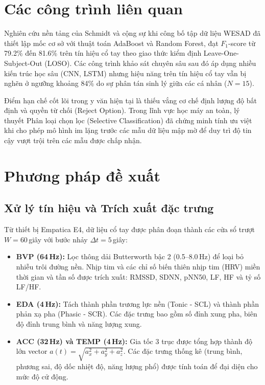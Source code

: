 \documentclass[conference]{IEEEtran}
\begin{document}
\section{Các công trình liên quan}
Nghiên cứu nền tảng của Schmidt và cộng sự \cite{schmidt2018wesad} khi công bố tập dữ liệu WESAD đã thiết lập mốc cơ sở với thuật toán AdaBoost và Random Forest, đạt $F_1$-score từ 79.2\% đến 81.6\% trên tín hiệu cổ tay theo giao thức kiểm định Leave-One-Subject-Out (LOSO). Các công trình khảo sát chuyên sâu sau đó \cite{bobade2020stress} áp dụng nhiều kiến trúc học sâu (CNN, LSTM) nhưng hiệu năng trên tín hiệu cổ tay vẫn bị nghẽn ở ngưỡng khoảng 84\% do sự phân tán sinh lý giữa các cá nhân ($N=15$).

Điểm hạn chế cốt lõi trong y văn hiện tại là thiếu vắng cơ chế định lượng độ bất định và quyền từ chối (Reject Option). Trong lĩnh vực học máy an toàn, lý thuyết Phân loại chọn lọc (Selective Classification) \cite{geifman2017selective} đã chứng minh tính ưu việt khi cho phép mô hình im lặng trước các mẫu dữ liệu mập mờ để duy trì độ tin cậy vượt trội trên các mẫu được chấp nhận.

\section{Phương pháp đề xuất}

\subsection{Xử lý tín hiệu và Trích xuất đặc trưng}
Từ thiết bị Empatica E4, dữ liệu cổ tay được phân đoạn thành các cửa sổ trượt $W = 60$\,giây với bước nhảy $\Delta t = 5$\,giây:
\begin{itemize}
    \item \textbf{BVP (64\,Hz):} Lọc thông dải Butterworth bậc 2 (0.5--8.0\,Hz) để loại bỏ nhiễu trôi đường nền. Nhịp tim và các chỉ số biến thiên nhịp tim (HRV) miền thời gian và tần số được trích xuất: RMSSD, SDNN, pNN50, LF, HF và tỷ số LF/HF.
    \item \textbf{EDA (4\,Hz):} Tách thành phần trương lực nền (Tonic - SCL) và thành phần phản xạ pha (Phasic - SCR). Các đặc trưng bao gồm số đỉnh xung pha, biên độ đỉnh trung bình và năng lượng xung.
    \item \textbf{ACC (32\,Hz) và TEMP (4\,Hz):} Gia tốc 3 trục được tổng hợp thành độ lớn vector $a(t) = \sqrt{a_x^2 + a_y^2 + a_z^2}$. Các đặc trưng thống kê (trung bình, phương sai, độ dốc nhiệt độ, năng lượng phổ) được tính toán để đại diện cho mức độ cử động.
\end{itemize}
\end{document}

